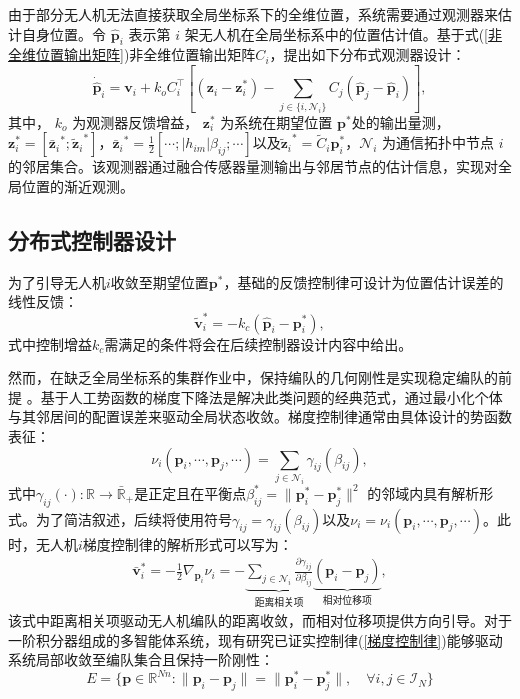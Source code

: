 由于部分无人机无法直接获取全局坐标系下的全维位置，系统需要通过观测器来估计自身位置。令 $\hat{\mathbf{p}}_i$ 表示第 $i$ 架无人机在全局坐标系中的位置估计值。基于式(\ref{非全维位置输出矩阵})非全维位置输出矩阵${C}_i$，提出如下分布式观测器设计：
\begin{equation}
	\dot{\hat{\mathbf{p}}}_i = \mathbf{v}_i + k_o {C}_i^\top \left[ (\mathbf{z}_i - \mathbf{z}_i^*) - \sum_{j \in \{i, \mathcal{N}_i\}} {C}_j (\hat{\mathbf{p}}_j - \hat{\mathbf{p}}_i) \right],
	\label{分布式观测器}
\end{equation}
其中， $k_o$ 为观测器反馈增益， $\mathbf{z}_i^*$ 为系统在期望位置 $\mathbf{p}^*$处的输出量测，$\mathbf{z}_i^*=[{\bar{\mathbf{z}}_i}^*;{\tilde{\mathbf{z}}_i}^*]$，${\bar{\mathbf{z}}_i}^*=\frac{1}{2}[\cdots;|h_{im}|\beta_{ij};\cdots]$以及${\tilde{\mathbf{z}}_i}^*=\tilde{C}_i \mathbf{p}_i^*$，$\mathcal{N}_i$ 为通信拓扑中节点 $i$ 的邻居集合。该观测器通过融合传感器量测输出与邻居节点的估计信息，实现对全局位置的渐近观测。

\subsection{分布式控制器设计}
为了引导无人机$i$收敛至期望位置$\mathbf{p}^*$，基础的反馈控制律可设计为位置估计误差的线性反馈：
\begin{equation}
	\tilde{\mathbf{v}}_i^* = 
	-k_c (\hat{\mathbf{p}}_i - \mathbf{p}^*_i),
	\label{反馈控制律}
\end{equation}
式中控制增益$k_c$需满足的条件将会在后续控制器设计内容中给出。

然而，在缺乏全局坐标系的集群作业中，保持编队的几何刚性是实现稳定编队的前提 \cite{7074770}。基于人工势函数的梯度下降法是解决此类问题的经典范式，通过最小化个体与其邻居间的配置误差来驱动全局状态收敛\cite{10.1016/j.automatica.2011.08.019}。梯度控制律通常由具体设计的势函数表征：
\begin{equation}
	\nu_i(\mathbf{p}_i,\cdots,\mathbf{p}_j,\cdots)=
	\sum_{j \in  \mathcal{N}_i} \gamma_{ij} (\beta_{ij}),
\end{equation}
式中$\gamma_{ij}(\cdot):\mathbb{R} \to \bar{\mathbb{R}}_+$是正定且在平衡点$\beta_{ij}^*=\|\mathbf{p}_i^* - \mathbf{p}_j^*\|^2$ 的邻域内具有解析形式。为了简洁叙述，后续将使用符号$\gamma_{ij}=\gamma_{ij} (\beta_{ij})$以及$\nu_i=\nu_i(\mathbf{p}_i,\cdots,\mathbf{p}_j,\cdots)$。此时，无人机$i$梯度控制律的解析形式可以写为：
\begin{align}
	\bar{\mathbf{v}}_i^* = 
	-\frac{1}{2} \nabla_{\mathbf{p}_i} \nu_i = 
	- \underbrace{
		\sum_{j \in  \mathcal{N}_i} \frac{\partial \gamma_{ij}}{\partial \beta_{ij}}
		}
		_{\text{距离相关项}}
	\underbrace{(\mathbf{p}_i - \mathbf{p}_j)}_{\text{相对位移项}},
	\label{梯度控制律}
\end{align}
该式中距离相关项驱动无人机编队的距离收敛，而相对位移项提供方向引导。对于一阶积分器组成的多智能体系统，现有研究已证实控制律(\ref{梯度控制律})能够驱动系统局部收敛至编队集合且保持一阶刚性\cite{7074770,Kwang2014Distance,https://doi.org/10.1002/rnc.3477}：
\begin{equation}
	E = \{ \mathbf{p} \in \mathbb{R}^{Nn} : 
	\|\mathbf{p}_i - \mathbf{p}_j\| = 
	\|\mathbf{p}_i^* - \mathbf{p}_j^*\|,
	\quad
	\forall i,j \in \mathcal{I}_{N}
	\}
\end{equation}

